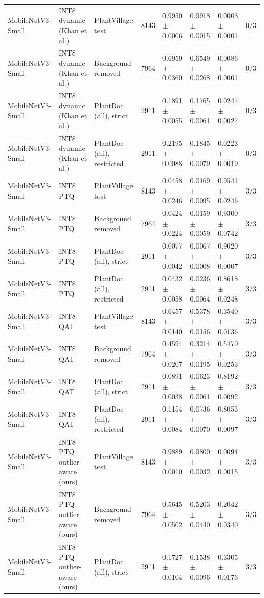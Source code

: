\begin{table}[t]
\begin{tabular}{llllllll}
MobileNetV3-Small & INT8 dynamic (Khan et al.) & PlantVillage test & 8143 & 0.9950 $\pm$ 0.0006 & 0.9918 $\pm$ 0.0015 & 0.0003 $\pm$ 0.0001 & 0/3 \\
MobileNetV3-Small & INT8 dynamic (Khan et al.) & Background removed & 7964 & 0.6959 $\pm$ 0.0360 & 0.6549 $\pm$ 0.0268 & 0.0086 $\pm$ 0.0001 & 0/3 \\
MobileNetV3-Small & INT8 dynamic (Khan et al.) & PlantDoc (all), strict & 2911 & 0.1891 $\pm$ 0.0055 & 0.1765 $\pm$ 0.0061 & 0.0247 $\pm$ 0.0027 & 0/3 \\
MobileNetV3-Small & INT8 dynamic (Khan et al.) & PlantDoc (all), restricted & 2911 & 0.2195 $\pm$ 0.0088 & 0.1845 $\pm$ 0.0079 & 0.0223 $\pm$ 0.0019 & 0/3 \\
MobileNetV3-Small & INT8 PTQ & PlantVillage test & 8143 & 0.0458 $\pm$ 0.0246 & 0.0169 $\pm$ 0.0095 & 0.9541 $\pm$ 0.0246 & 3/3 \\
MobileNetV3-Small & INT8 PTQ & Background removed & 7964 & 0.0424 $\pm$ 0.0224 & 0.0159 $\pm$ 0.0059 & 0.9300 $\pm$ 0.0742 & 3/3 \\
MobileNetV3-Small & INT8 PTQ & PlantDoc (all), strict & 2911 & 0.0077 $\pm$ 0.0042 & 0.0067 $\pm$ 0.0008 & 0.9020 $\pm$ 0.0007 & 3/3 \\
MobileNetV3-Small & INT8 PTQ & PlantDoc (all), restricted & 2911 & 0.0432 $\pm$ 0.0058 & 0.0236 $\pm$ 0.0064 & 0.8618 $\pm$ 0.0248 & 3/3 \\
MobileNetV3-Small & INT8 QAT & PlantVillage test & 8143 & 0.6457 $\pm$ 0.0140 & 0.5378 $\pm$ 0.0156 & 0.3540 $\pm$ 0.0136 & 3/3 \\
MobileNetV3-Small & INT8 QAT & Background removed & 7964 & 0.4594 $\pm$ 0.0207 & 0.3214 $\pm$ 0.0195 & 0.5470 $\pm$ 0.0253 & 3/3 \\
MobileNetV3-Small & INT8 QAT & PlantDoc (all), strict & 2911 & 0.0891 $\pm$ 0.0038 & 0.0623 $\pm$ 0.0061 & 0.8192 $\pm$ 0.0092 & 3/3 \\
MobileNetV3-Small & INT8 QAT & PlantDoc (all), restricted & 2911 & 0.1154 $\pm$ 0.0084 & 0.0736 $\pm$ 0.0070 & 0.8053 $\pm$ 0.0097 & 3/3 \\
MobileNetV3-Small & INT8 PTQ outlier-aware (ours) & PlantVillage test & 8143 & 0.9889 $\pm$ 0.0010 & 0.9800 $\pm$ 0.0032 & 0.0094 $\pm$ 0.0015 & 3/3 \\
MobileNetV3-Small & INT8 PTQ outlier-aware (ours) & Background removed & 7964 & 0.5645 $\pm$ 0.0502 & 0.5203 $\pm$ 0.0440 & 0.2042 $\pm$ 0.0340 & 3/3 \\
MobileNetV3-Small & INT8 PTQ outlier-aware (ours) & PlantDoc (all), strict & 2911 & 0.1727 $\pm$ 0.0104 & 0.1538 $\pm$ 0.0096 & 0.3305 $\pm$ 0.0176 & 3/3 \\

\end{tabular}
\end{table}
